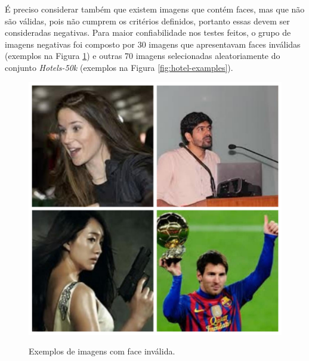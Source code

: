 É preciso considerar também que existem imagens que contém faces, mas que não são válidas, pois não cumprem os critérios definidos, portanto essas devem ser consideradas negativas. Para maior confiabilidade nos testes feitos, o grupo de imagens negativas foi composto por 30 imagens que apresentavam faces inválidas (exemplos na Figura \ref{fig:invalid-faces}) e outras 70 imagens selecionadas aleatoriamente do conjunto \textit{Hotels-50k} (exemplos na Figura \ref{fig:hotel-examples}).

\begin{figure}[tbp]
    \centering
    \caption{Exemplos de imagens com face inválida.}
    \includegraphics[scale=.25]{figs/invalid_faces.jpg}
    \label{fig:invalid-faces}
\end{figure}

